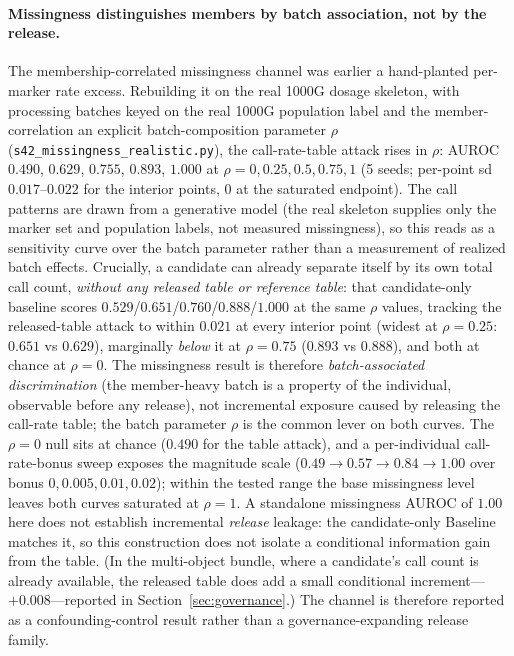 \documentclass[11pt]{article}
\begin{document}
\paragraph{Missingness distinguishes members by batch association, not by the release.}
The membership-correlated missingness channel was earlier a hand-planted
per-marker rate excess. Rebuilding it on the real 1000G dosage skeleton, with
processing batches keyed on the real 1000G population label and the
member-correlation an explicit batch-composition parameter $\rho$
(\texttt{s42\_missingness\_realistic.py}), the call-rate-table attack rises
in $\rho$: AUROC $0.490$, $0.629$, $0.755$, $0.893$, $1.000$ at
$\rho{=}0,0.25,0.5,0.75,1$ (5 seeds; per-point sd $0.017$--$0.022$ for the
interior points, $0$ at the saturated endpoint). The call patterns are drawn from a generative model
(the real skeleton supplies only the marker set and population labels,
not measured missingness), so this reads as a sensitivity curve over the batch
parameter rather than a measurement of realized batch effects. Crucially, a
candidate can already separate itself by its own total call count, \emph{without
any released table or reference table}: that candidate-only baseline scores
$0.529$/$0.651$/$0.760$/$0.888$/$1.000$ at the same $\rho$ values, tracking the
released-table attack to within $0.021$ at every interior point (widest at
$\rho{=}0.25$: $0.651$ vs $0.629$), marginally \emph{below} it at
$\rho{=}0.75$ ($0.893$ vs $0.888$), and both at chance at $\rho{=}0$. The
missingness result is therefore
\emph{batch-associated discrimination} (the member-heavy batch is a property of
the individual, observable before any release), not incremental exposure caused
by releasing the call-rate table; the batch parameter $\rho$ is the common lever
on both curves. The $\rho{=}0$ null sits at chance
($0.490$ for the table attack), and a per-individual call-rate-bonus sweep
exposes the magnitude scale ($0.49{\to}0.57{\to}0.84{\to}1.00$ over bonus
$0,0.005,0.01,0.02$); within the tested range the base missingness level leaves
both curves saturated at $\rho{=}1$. A standalone missingness AUROC of $1.00$
here does not establish incremental \emph{release} leakage: the candidate-only
Baseline matches it, so this construction does not isolate a conditional
information gain from the table. (In the multi-object bundle, where a candidate's
call count is already available, the released table does add a small conditional
increment---$+0.008$---reported in Section~\ref{sec:governance}.) The channel
is therefore reported as a confounding-control result rather than a
governance-expanding release family.
\end{document}
